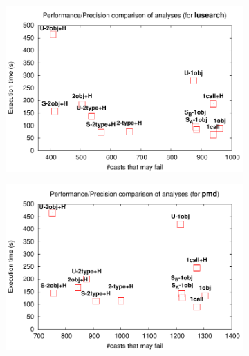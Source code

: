 \begin{figure}[tbp]
\begin{center}
\begin{subfigure}[b]{0.45\textwidth}
\end{subfigure}\hspace{1cm}%
\begin{subfigure}[b]{0.45\textwidth}
\includegraphics[width=\textwidth]{assets/hybrid/lusearch.pdf}
\end{subfigure}
\begin{subfigure}[b]{0.45\textwidth}
\includegraphics[width=\textwidth]{assets/hybrid/pmd.pdf}
\end{subfigure}\hspace{1cm}%
\begin{subfigure}[b]{0.45\textwidth}

\end{subfigure}
\end{center}
\end{figure}
